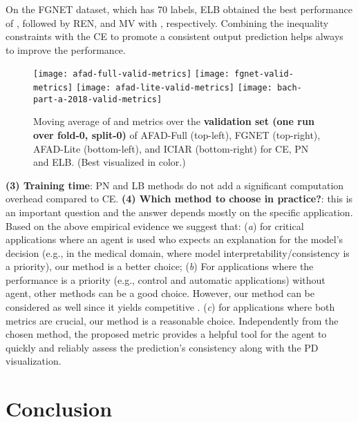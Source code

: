 \documentclass[8pt]{article}
\theoremstyle{definition}
\begin{document}
On the FGNET dataset, which has 70 labels, ELB obtained the best performance of ,  followed by REN, and MV with , respectively. Combining the inequality constraints with the CE to promote a consistent output prediction helps always to improve the  performance.
\begin{figure*}[ht!]
  \centering
  \texttt{[image: afad-full-valid-metrics]}
  \texttt{[image: fgnet-valid-metrics]}
  \texttt{[image: afad-lite-valid-metrics]}
  \texttt{[image: bach-part-a-2018-valid-metrics]}
  \caption{Moving average of  and  metrics over the \textbf{validation set (one run over fold-0, split-0)} of AFAD-Full (top-left), FGNET (top-right), AFAD-Lite (bottom-left), and ICIAR (bottom-right) for CE, PN and ELB. (Best visualized in color.)}
  \label{fig:curves-valid-others-main}
\end{figure*}
\textbf{(3) Training time}: PN and LB methods do not add a significant computation overhead compared to CE. \textbf{(4) Which method to choose in practice?}: this is an important question and the answer depends mostly on the specific application.  Based on the above empirical evidence we suggest that: (\emph{a}) for critical applications where an agent is used who expects an explanation for the model’s decision (e.g., in the medical domain, where model interpretability/consistency is a priority),  our method is a better choice; (\emph{b}) For applications where the  performance is a priority (e.g., control and automatic applications) without agent, other methods can be a good choice. However, our method can be considered as well since it yields competitive . (\emph{c}) for applications where both metrics are crucial, our method is a reasonable choice. \hspace{2mm} Independently from the chosen method, the proposed  metric provides a helpful tool for the agent to quickly and reliably assess the prediction’s consistency along with the PD visualization.





\section{Conclusion}
\label{sec:conclusion}
\end{document}
